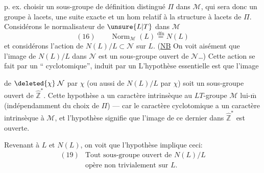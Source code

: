 
p. ex. choisir un sous-groupe de définition distingué $\Pi$ dans $\mathcal{M}$, qui sera donc un groupe à lacets,  une suite exacte
et un hom
relatif à la structure à lacets de $\Pi$. Considérons le normalisateur de $\unsure{L|T}$ dans $\mathcal{M}$
\[
(16)\qquad \operatorname{Norm}_{\mathcal{M}}(L)\overset{\mathrm{dfn}}{=}N(L)
\]
et considérons l'action de $N(L)/L\subset\mathcal{N}$  sur $L$. (\uline{NB} On voit aisément que l'image de $N(L)/L$ dans $\mathcal{N}$ est un sous-groupe ouvert de $\mathcal{N}$\ldots) Cette action se fait par un `` cyclotomique'', induit par un 
L'hypothèse essentielle est que l'image


de $\deleted{\chi}\;\mathcal{N}$ par $\chi$ (ou aussi de $N(L)/L$ par $\chi$) soit un sous-groupe ouvert de $\widehat{\mathbb{Z}}^{*}$. Cette hypothèse a un caractère intrinsèque au $LT$-groupe $\mathcal{M}$ lui-$\overline{\mathrm m}$ (indépendamment du choix de $\Pi$) --- car le caractère cyclotomique
a un caractère intrinsèque à $\mathcal{M}$, et l'hypothèse signifie que l'image de ce dernier dans $\widehat{\mathbb{Z}}^{*}$ est ouverte.

Revenant à $L$ et $N(L)$, on voit que l'hypothèse  implique ceci:
\[
\begin{array}{ll}
(19)&\text{Tout sous-groupe ouvert de }N(L)/L\\
&\text{opère non trivialement sur }L.
\end{array}
\]

